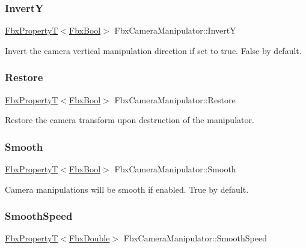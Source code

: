 \subsubsection{\texorpdfstring{InvertY}{InvertY}}
{\footnotesize\ttfamily \hyperlink{class_fbx_property_t}{Fbx\+PropertyT}$<$\hyperlink{fbxtypes_8h_a92e0562b2fe33e76a242f498b362262e}{Fbx\+Bool}$>$ Fbx\+Camera\+Manipulator\+::\+InvertY}

Invert the camera vertical manipulation direction if set to true. False by default. \mbox{\label{class_fbx_camera_manipulator_aafe0b0e43ecaf16a44a49ae2d55f440a}} 
\subsubsection{\texorpdfstring{Restore}{Restore}}
{\footnotesize\ttfamily \hyperlink{class_fbx_property_t}{Fbx\+PropertyT}$<$\hyperlink{fbxtypes_8h_a92e0562b2fe33e76a242f498b362262e}{Fbx\+Bool}$>$ Fbx\+Camera\+Manipulator\+::\+Restore}

Restore the camera transform upon destruction of the manipulator. \mbox{\label{class_fbx_camera_manipulator_abdefaf7c5fef50e2c873616099c2a579}} 
\subsubsection{\texorpdfstring{Smooth}{Smooth}}
{\footnotesize\ttfamily \hyperlink{class_fbx_property_t}{Fbx\+PropertyT}$<$\hyperlink{fbxtypes_8h_a92e0562b2fe33e76a242f498b362262e}{Fbx\+Bool}$>$ Fbx\+Camera\+Manipulator\+::\+Smooth}

Camera manipulations will be smooth if enabled. True by default. \mbox{\label{class_fbx_camera_manipulator_afa0edcbcd8ad9a4de15672c7e8fc0c3d}} 
\subsubsection{\texorpdfstring{Smooth\+Speed}{SmoothSpeed}}
{\footnotesize\ttfamily \hyperlink{class_fbx_property_t}{Fbx\+PropertyT}$<$\hyperlink{fbxtypes_8h_a171e72a1c46fc15c1a6c9c31948c1c5b}{Fbx\+Double}$>$ Fbx\+Camera\+Manipulator\+::\+Smooth\+Speed}

